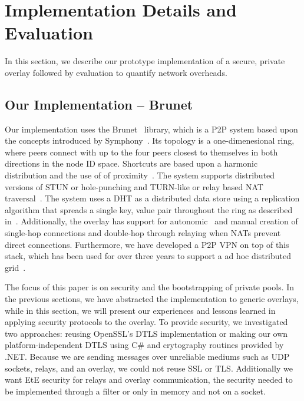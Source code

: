 \documentclass[conference]{IEEEtran}
\begin{document}
\section{Implementation Details and Evaluation}
\label{evaluations}
In this section, we describe our prototype implementation of a secure, private
overlay followed by evaluation to quantify network overheads.

\subsection{Our Implementation -- Brunet}
\label{implementation}
Our implementation uses the Brunet~\cite{brunet} library, which is a P2P system
based upon the concepts introduced by Symphony~\cite{symphony}.  Its topology is a
one-dimenesional ring, where peers connect with up to the four peers closest
to themselves in both directions in the node ID space.  Shortcuts are based
upon a harmonic distribution and the use of of proximity~\cite{hpdc08_0}.  The
system supports distributed versions of STUN or hole-punching and TURN-like or
relay based NAT traversal~\cite{nsdi10}.  The system uses a DHT as a distributed
data store using a replication algorithm that spreads a single key, value pair
throughout the ring as described in~\cite{pcgrid07}.  Additionally, the overlay
has support for autonomic~\cite{wow} and manual creation of single-hop
connections and double-hop through relaying when NATs prevent direct
connections.  Furthermore, we have developed a P2P VPN on top of this stack,
which has been used for over three years to support a ad hoc distributed
grid~\cite{archer, gridappliance}.

The focus of this paper is on security and the bootstrapping of private pools.
In the previous sections, we have abstracted the implementation to generic
overlays, while in this section, we will present our experiences and lessons
learned in applying security protocols to the overlay.  To provide security, we
investigated two approaches:  reusing OpenSSL's DTLS implementation or making
our own platform-independent DTLS using C\# and crytography routines provided
by .NET.  Because we are sending messages over unreliable mediums such as UDP
sockets, relays, and an overlay, we could not reuse SSL or TLS.  Additionally
we want EtE security for relays and overlay communication, the security needed
to be implemented through a filter or only in memory and not on a socket.
\end{document}
